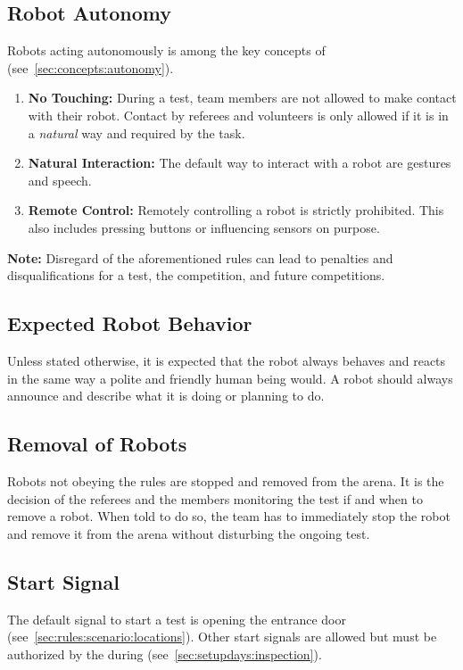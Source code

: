 \subsection{Robot Autonomy}
\label{sec:rules:autonomy}
Robots acting autonomously is among the key concepts of \AtHome{} (see~\ref{sec:concepts:autonomy}).
\begin{enumerate}
	\item \textbf{No Touching:} During a test, team members are not allowed to make contact with their robot. Contact by referees and volunteers is only allowed if it is in a \textit{natural} way and required by the task.

	\item \textbf{Natural Interaction:} The default way to interact with a robot are gestures and speech.

	\item \textbf{Remote Control:} Remotely controlling a robot is strictly prohibited.
	This also includes pressing buttons or influencing sensors on purpose.
\end{enumerate}

\noindent\textbf{Note:} Disregard of the aforementioned rules can lead to penalties and disqualifications for a test, the competition, and future competitions.

\subsection{Expected Robot Behavior}
\label{sec:rules:robotbehavior}
Unless stated otherwise, it is expected that the robot always behaves and reacts in the same way a polite and friendly human being would.
A robot should always announce and describe what it is doing or planning to do.

\subsection{Removal of Robots}
\label{sec:rules:robotremoval}
Robots not obeying the rules are stopped and removed from the arena. It is the decision of the referees and the  members monitoring the test if and when to remove a robot. When told to do so, the team has to immediately stop the robot and remove it from the arena without disturbing the ongoing test.


\subsection{Start Signal}
\label{sec:rules:startsignal}
The default signal to start a test is opening the entrance door (see~\ref{sec:rules:scenario:locations}).
Other start signals are allowed but must be authorized by the  during \RobotInspection{} (see~\ref{sec:setupdays:inspection}).

